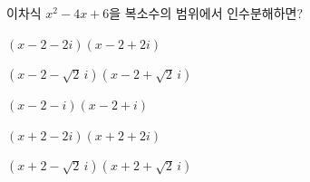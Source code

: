 이차식 $x^2-4x+6$을 복소수의 범위에서 인수분해하면?
\begin{choicesv}{\rule[-3ex]{0pt}{8ex}$(x-2-2i)(x-2+2i)$}{\rule[-3ex]{0pt}{8ex}$(x-2-\sqrt{2}\,i)(x-2+\sqrt{2}\,i)$}{\rule[-3ex]{0pt}{8ex}$(x-2-i)(x-2+i)$}{\rule[-3ex]{0pt}{8ex}$(x+2-2i)(x+2+2i)$}{\rule[-3ex]{0pt}{8ex}$(x+2-\sqrt{2}\,i)(x+2+\sqrt{2}\,i)$}\end{choicesv}

